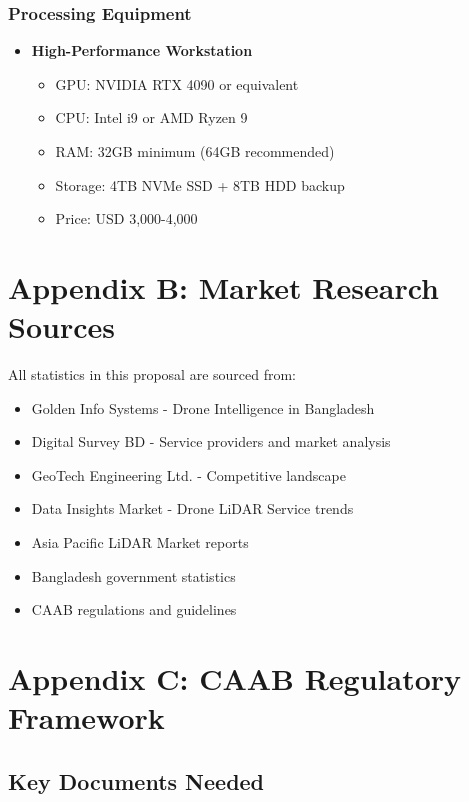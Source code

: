 \subsection*{Processing Equipment}

\begin{itemize}
    \item \textbf{High-Performance Workstation}
    \begin{itemize}
        \item GPU: NVIDIA RTX 4090 or equivalent
        \item CPU: Intel i9 or AMD Ryzen 9
        \item RAM: 32GB minimum (64GB recommended)
        \item Storage: 4TB NVMe SSD + 8TB HDD backup
        \item Price: USD 3,000-4,000
    \end{itemize}
\end{itemize}

\chapter*{Appendix B: Market Research Sources}

All statistics in this proposal are sourced from:

\begin{itemize}
    \item Golden Info Systems - Drone Intelligence in Bangladesh
    \item Digital Survey BD - Service providers and market analysis
    \item GeoTech Engineering Ltd. - Competitive landscape
    \item Data Insights Market - Drone LiDAR Service trends
    \item Asia Pacific LiDAR Market reports
    \item Bangladesh government statistics
    \item CAAB regulations and guidelines
\end{itemize}

\chapter*{Appendix C: CAAB Regulatory Framework}

\section*{Key Documents Needed}

